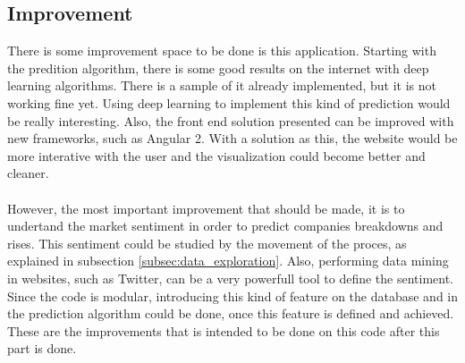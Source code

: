 \subsection{Improvement}
There is some improvement space to be done is this application. Starting with the predition algorithm, there is some good results on the internet with deep learning algorithms. There is a sample
of it already implemented, but it is not working fine yet. Using deep learning to implement this kind of prediction would be really interesting. Also, the front end solution presented can be
improved with new frameworks, such as Angular 2. With a solution as this, the website would be more interative with the user and the visualization could become better and cleaner.\\
\\
However, the most important improvement that should be made, it is to undertand the market sentiment in order to predict companies breakdowns and rises. This sentiment could be studied by the movement
of the proces, as explained in subsection \ref{subsec:data_exploration}. Also, performing data mining in websites, such as Twitter, can be a very powerfull tool to define the sentiment. Since the 
code is modular, introducing this kind of feature on the database and in the prediction algorithm could be done, once this feature is defined and achieved. These are the improvements that is intended
to be done on this code after this part is done.